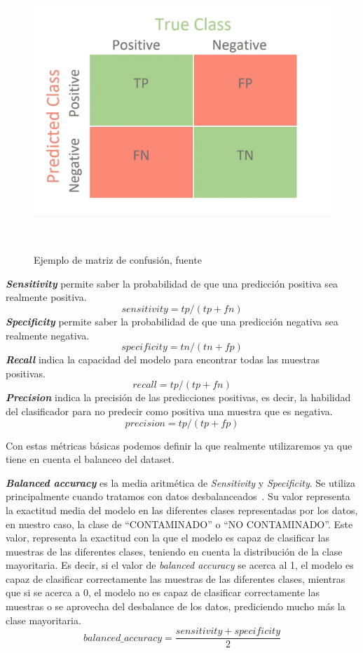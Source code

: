 \begin{figure}[!ht]
    \centering
    \includegraphics[width=0.7\linewidth]{media/images/confusion-matrix-example.png}
    \caption{Ejemplo de matriz de confusión, fuente\ \cite{Confusio71:online}}\ \label{fig:confusion-matrix-example}
\end{figure}
\textit{\textbf{Sensitivity}} permite saber la probabilidad de que una predicción positiva sea realmente positiva.
    \begin{equation}
        sensitivity=tp/(tp+fn)
    \end{equation}
\textit{\textbf{Specificity}} permite saber la probabilidad de que una predicción negativa sea realmente negativa.
\begin{equation}
        specificity=tn/(tn+fp)
    \end{equation}
\textit{\textbf{Recall}} indica la capacidad del modelo para encontrar todas las muestras positivas. 
    \begin{equation}
        recall=tp/(tp+fn)
    \end{equation}
\textit{\textbf{Precision}} indica la precisión de las predicciones positivas, es decir, la habilidad del clasificador para no predecir como positiva una muestra que es negativa.
    \begin{equation}
        precision=tp/(tp+fp)
    \end{equation}

Con estas métricas básicas podemos definir la que realmente utilizaremos ya que tiene en cuenta el balanceo del \gls{dataset}.

\textit{\textbf{Balanced accuracy}} es la media aritmética de \textit{Sensitivity} y \textit{Specificity}. Se utiliza principalmente cuando tratamos con datos desbalanceados\ \cite{Balanced44:online}. Su valor representa la exactitud media del modelo en las diferentes clases representadas por los datos, en nuestro caso, la clase de ``CONTAMINADO'' o ``NO CONTAMINADO''. Este valor, representa la exactitud con la que el modelo es capaz de clasificar las muestras de las diferentes clases, teniendo en cuenta la distribución de la clase mayoritaria. Es decir, si el valor de \textit{balanced accuracy} se acerca al 1, el modelo es capaz de clasificar correctamente las muestras de las diferentes clases, mientras que si se acerca a 0, el modelo no es capaz de clasificar correctamente las muestras o se aprovecha del desbalance de los datos, prediciendo mucho más la clase mayoritaria.
\begin{equation}
    balanced\_accuracy =\frac{sensitivity + specificity}{2}
\end{equation}

